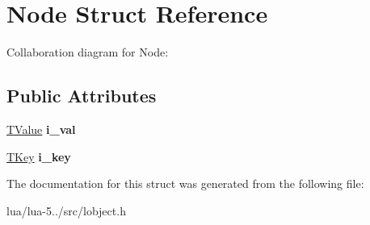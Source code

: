 \hypertarget{struct_node}{\section{Node Struct Reference}
\label{struct_node}
}


Collaboration diagram for Node\+:
\subsection*{Public Attributes}
\begin{DoxyCompactItemize}
\item 
\hypertarget{struct_node_a79460c331faee0ef988637e92749e866}{\hyperlink{structlua___t_value}{T\+Value} {\bfseries i\+\_\+val}}\label{struct_node_a79460c331faee0ef988637e92749e866}

\item 
\hypertarget{struct_node_aebc572dbe9e3b392c3231046475c7faa}{\hyperlink{union_t_key}{T\+Key} {\bfseries i\+\_\+key}}\label{struct_node_aebc572dbe9e3b392c3231046475c7faa}

\end{DoxyCompactItemize}


The documentation for this struct was generated from the following file\+:\begin{DoxyCompactItemize}
\item 
lua/lua-\/5../src/lobject.\+h\end{DoxyCompactItemize}
